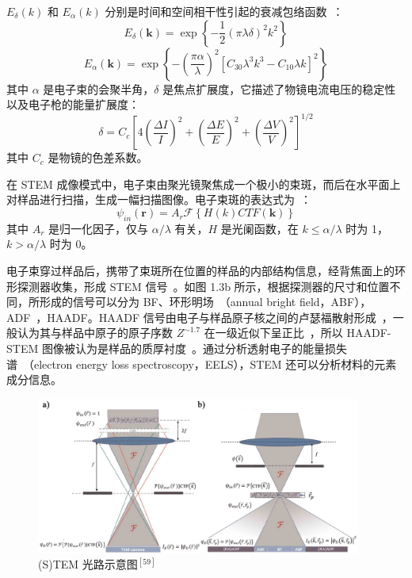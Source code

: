 $E_{\delta}(k)$ 和 $E_{\alpha}(k)$ 分别是时间和空间相干性引起的衰减包络函数~\cite{Chen2004,Chang2006}：
\begin{equation}E_{\delta}(\boldsymbol{k})=\exp \left\{-\frac{1}{2}(\pi \lambda \delta)^{2} k^{2}\right\}\end{equation}
\begin{equation}E_{\alpha}(\boldsymbol{k})=\exp \left\{-\left(\frac{\pi \alpha}{\lambda}\right)^{2}\left[C_{30} \lambda^{3} k^{3}-C_{10} \lambda k\right]^{2}\right\}\end{equation}
其中 $\alpha$ 是电子束的会聚半角，$\delta$ 是焦点扩展度，它描述了物镜电流电压的稳定性以及电子枪的能量扩展度：
\begin{equation}\delta=C_{c}\left[4\left(\frac{\Delta I}{I}\right)^{2}+\left(\frac{\Delta E}{E}\right)^{2}+\left(\frac{\Delta V}{V}\right)^{2}\right]^{1 / 2}\end{equation}
其中 $C_c$ 是物镜的色差系数。

在 STEM 成像模式中，电子束由聚光镜聚焦成一个极小的束斑，而后在水平面上对样品进行扫描，生成一幅扫描图像。电子束斑的表达式为~\cite{Xin2009}：
\begin{equation}
\psi_{in}(\boldsymbol{r})=A_r\mathcal{F}\left\{H(k)\textit{CTF}(\boldsymbol{k})\right\}
\end{equation}
其中 $A_r$ 是归一化因子，仅与 $\alpha/\lambda$ 有关，$H$ 是光阑函数，在 $k\leq\alpha/\lambda$ 时为 1，$k>\alpha/\lambda$ 时为 0。

电子束穿过样品后，携带了束斑所在位置的样品的内部结构信息，经背焦面上的环形探测器收集，形成 STEM 信号~\cite{Bosch2015}。如图 1.3b 所示，根据探测器的尺寸和位置不同，所形成的信号可以分为 BF、环形明场~\cite{Ma2018,Gao2017,Kim2017,Findlay2010}（annual bright field，ABF），ADF~\cite{Kirkland2011,Xin2009,Hillyard1993,Hillyard1995,Loane1992}，HAADF。HAADF 信号由电子与样品原子核之间的卢瑟福散射形成~\cite{VandenBroek2012}，一般认为其与样品中原子的原子序数 $Z^{\sim 1.7}$ 在一级近似下呈正比~\cite{Nellist2000,Midgley2003,Wang1991-1,Treacy1993}，所以 HAADF-STEM 图像被认为是样品的质厚衬度~\cite{Kubel2005}。通过分析透射电子的能量损失谱~\cite{Batson1993,Fink1984,Kimoto2007}（electron energy loss spectroscopy，EELS），STEM 还可以分析材料的元素成分信息。
\begin{figure}[htbp]
	\vspace{\baselineskip}
	\centering
	\includegraphics[width=0.95\textwidth]{../1.3/13}
	\caption{(S)TEM 光路示意图$^{[59]}$}\label{fig:13}
	\song{}
\end{figure}

